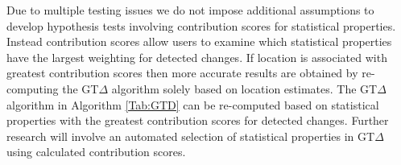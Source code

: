 Due to multiple  testing issues we do not impose additional assumptions to develop hypothesis tests involving contribution scores for statistical properties.    
Instead contribution scores allow users to examine which statistical properties have the largest weighting for detected changes. If location is  associated with greatest contribution  scores then   more accurate results are obtained by re-computing the GT$\Delta$ algorithm solely based on location estimates. %
  The GT$\Delta$ algorithm  in Algorithm \ref{Tab:GTD} can be re-computed based on statistical properties with the greatest  contribution scores for detected changes. 
{   Further research will involve an automated  selection of statistical properties in GT$\Delta$ using calculated contribution scores. }%

